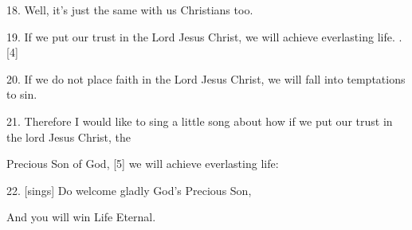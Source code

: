 {\Large{}18. Well, it's just the same with us Christians too.}

{\Large{}19. If we put our trust in the Lord Jesus Christ, we will achieve everlasting
life. .[4]}

{\Large{}20. If we do not place faith in the Lord Jesus Christ, we will fall into
temptations to sin.}

{\Large{}21. Therefore I would like to sing a little song about how if we put our
trust in the lord Jesus Christ, the       }

{\Large{}Precious Son of God, [5] we will achieve everlasting life:}

{\Large{}22. [sings] Do welcome gladly God's Precious Son,        }

{\Large{}And you will win Life Eternal.}

